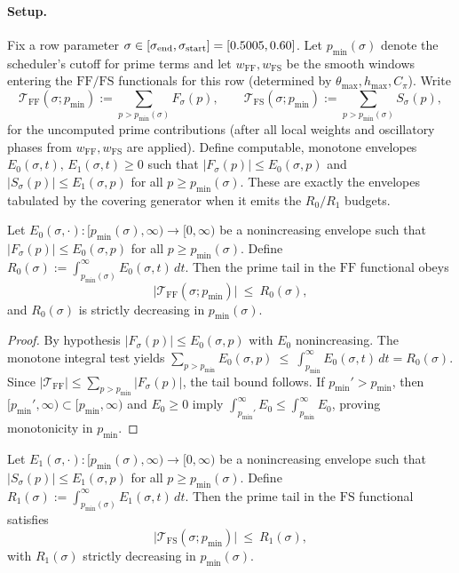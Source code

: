 \documentclass[11pt]{article}
\theoremstyle{definition}
\theoremstyle{remark}
\begin{document}
\paragraph{Setup.}
Fix a row parameter $\sigma\in[\sigma_{\rm end},\sigma_{\rm start}]=[0.5005,0.60]$.
Let $p_{\min}(\sigma)$ denote the scheduler's cutoff for prime terms and
let $w_{\mathrm{FF}},w_{\mathrm{FS}}$ be the smooth windows entering the
$\mathrm{FF}/\mathrm{FS}$ functionals for this row (determined by
$\theta_{\max},h_{\max},C_{\pi}$).
Write
\[
\mathcal T_{\mathrm{FF}}(\sigma;p_{\min})
  :=\sum_{p>p_{\min}(\sigma)} F_{\sigma}(p),
\qquad
\mathcal T_{\mathrm{FS}}(\sigma;p_{\min})
  :=\sum_{p>p_{\min}(\sigma)} S_{\sigma}(p),
\]
for the uncomputed prime contributions (after all local weights and
oscillatory phases from $w_{\mathrm{FF}},w_{\mathrm{FS}}$ are applied).
Define computable, monotone envelopes $E_0(\sigma,t),\,E_1(\sigma,t)\ge0$
such that $|F_{\sigma}(p)|\le E_0(\sigma,p)$ and $|S_{\sigma}(p)|\le E_1(\sigma,p)$
for all $p\ge p_{\min}(\sigma)$. These are exactly the envelopes tabulated
by the covering generator when it emits the $R_0/R_1$ budgets.
\begin{ptlemma}\label{lem:PT0}
Let $E_0(\sigma,\cdot):[p_{\min}(\sigma),\infty)\to[0,\infty)$ be a nonincreasing envelope such that $|F_{\sigma}(p)|\le E_0(\sigma,p)$ for all $p\ge p_{\min}(\sigma)$. Define $R_0(\sigma):=\int_{p_{\min}(\sigma)}^{\infty}E_0(\sigma,t)\,dt$. Then the prime tail in the $\mathrm{FF}$ functional obeys
\[
  \bigl|\mathcal T_{\mathrm{FF}}(\sigma;p_{\min})\bigr|\ \le\ R_0(\sigma),
\]
and $R_0(\sigma)$ is strictly decreasing in $p_{\min}(\sigma)$.
\end{ptlemma}

\begin{proof}
By hypothesis $|F_{\sigma}(p)|\le E_0(\sigma,p)$ with $E_0$ nonincreasing. The monotone integral test yields
\(\sum_{p>p_{\min}} E_0(\sigma,p)\ \le\ \int_{p_{\min}}^{\infty}E_0(\sigma,t)\,dt=R_0(\sigma).\)
Since $|\mathcal T_{\mathrm{FF}}|\le\sum_{p>p_{\min}}|F_{\sigma}(p)|$, the tail bound follows. If $p_{\min}'\!>p_{\min}$, then $[p_{\min}',\infty)\subset[p_{\min},\infty)$ and $E_0\ge0$ imply $\int_{p_{\min}'}^{\infty}E_0\le\int_{p_{\min}}^{\infty}E_0$, proving monotonicity in $p_{\min}$.
\end{proof}

\begin{ptlemma}\label{lem:PT1}
Let $E_1(\sigma,\cdot):[p_{\min}(\sigma),\infty)\to[0,\infty)$ be a nonincreasing envelope such that $|S_{\sigma}(p)|\le E_1(\sigma,p)$ for all $p\ge p_{\min}(\sigma)$. Define $R_{1}(\sigma):=\int_{p_{\min}(\sigma)}^{\infty}E_1(\sigma,t)\,dt$. Then the prime tail in the $\mathrm{FS}$ functional satisfies
\[
  \bigl|\mathcal T_{\mathrm{FS}}(\sigma;p_{\min})\bigr|\ \le\ R_{1}(\sigma),
\]
with $R_{1}(\sigma)$ strictly decreasing in $p_{\min}(\sigma)$.
\end{ptlemma}
\end{document}
